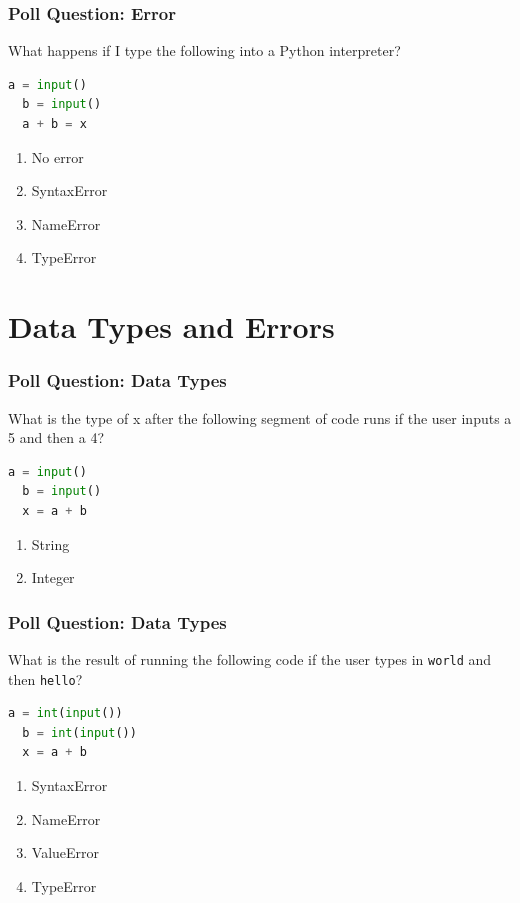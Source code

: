 \documentclass{beamer}
\begin{document}
%
%
%
\begin{frame}[fragile]
  \frametitle{Poll Question: Error}
  What happens if I type the following into a Python interpreter?
  \begin{lstlisting}[language=Python]
  a = input()
  b = input()
  a + b = x \end{lstlisting}
  \begin{enumerate}
    \item No error
    \item SyntaxError
    \item NameError
    \item TypeError
  \end{enumerate}
\end{frame}

\section{Data Types and Errors}

%
%
%
\begin{frame}[fragile]
  \frametitle{Poll Question: Data Types}
  What is the type of x after the following segment of code runs if the user inputs a 5 and then a 4?
  \begin{lstlisting}[language=Python]
  a = input()
  b = input()
  x = a + b\end{lstlisting}
  \begin{enumerate}[A]
    \item String
    \item Integer
  \end{enumerate}
\end{frame}

%
%
%
\begin{frame}[fragile]
  \frametitle{Poll Question: Data Types}
  What is the result of running the following code if the user types in \lstinline|world| and then \lstinline|hello|?
  \begin{lstlisting}[language=Python]
  a = int(input())
  b = int(input())
  x = a + b\end{lstlisting}
  \begin{enumerate}[A]
    \item SyntaxError
    \item NameError
    \item ValueError
    \item TypeError
  \end{enumerate}
\end{frame}
\end{document}
